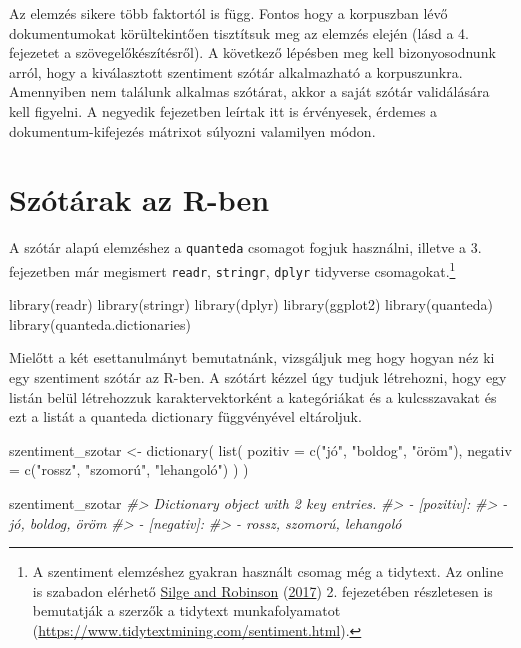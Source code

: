 \documentclass[
]{book}
\newenvironment{Shaded}{\begin{snugshade}}{\end{snugshade}}
\newcommand{\AttributeTok}[1]{\textcolor[rgb]{0.77,0.63,0.00}{#1}}
\newcommand{\CommentTok}[1]{\textcolor[rgb]{0.56,0.35,0.01}{\textit{#1}}}
\newcommand{\FunctionTok}[1]{\textcolor[rgb]{0.00,0.00,0.00}{#1}}
\newcommand{\NormalTok}[1]{#1}
\newcommand{\OtherTok}[1]{\textcolor[rgb]{0.56,0.35,0.01}{#1}}
\newcommand{\StringTok}[1]{\textcolor[rgb]{0.31,0.60,0.02}{#1}}
\begin{document}
Az elemzés sikere több faktortól is függ. Fontos hogy a korpuszban lévő
dokumentumokat körültekintően tisztítsuk meg az elemzés elején (lásd a
4. fejezetet a szövegelőkészítésről). A következő lépésben meg kell
bizonyosodnunk arról, hogy a kiválasztott szentiment szótár alkalmazható
a korpuszunkra. Amennyiben nem találunk alkalmas szótárat, akkor a saját
szótár validálására kell figyelni. A negyedik fejezetben leírtak itt is
érvényesek, érdemes a dokumentum-kifejezés mátrixot súlyozni valamilyen
módon.

\hypertarget{szuxf3tuxe1rak-az-r-ben}{%
\section{Szótárak az R-ben}\label{szuxf3tuxe1rak-az-r-ben}}

A szótár alapú elemzéshez a \texttt{quanteda} csomagot fogjuk használni,
illetve a 3. fejezetben már megismert \texttt{readr}, \texttt{stringr},
\texttt{dplyr} tidyverse csomagokat.\footnote{A szentiment elemzéshez
  gyakran használt csomag még a tidytext. Az online is szabadon elérhető
  \protect\hyperlink{ref-silge2017text}{Silge and Robinson}
  (\protect\hyperlink{ref-silge2017text}{2017}) 2. fejezetében
  részletesen is bemutatják a szerzők a tidytext munkafolyamatot
  (\url{https://www.tidytextmining.com/sentiment.html}).}

\begin{Shaded}
\begin{Highlighting}[]
\FunctionTok{library}\NormalTok{(readr)}
\FunctionTok{library}\NormalTok{(stringr)}
\FunctionTok{library}\NormalTok{(dplyr)}
\FunctionTok{library}\NormalTok{(ggplot2)}
\FunctionTok{library}\NormalTok{(quanteda)}
\FunctionTok{library}\NormalTok{(quanteda.dictionaries)}
\end{Highlighting}
\end{Shaded}

Mielőtt a két esettanulmányt bemutatnánk, vizsgáljuk meg hogy hogyan néz
ki egy szentiment szótár az R-ben. A szótárt kézzel úgy tudjuk
létrehozni, hogy egy listán belül létrehozzuk karaktervektorként a
kategóriákat és a kulcsszavakat és ezt a listát a quanteda dictionary
függvényével eltároljuk.

\begin{Shaded}
\begin{Highlighting}[]
\NormalTok{szentiment\_szotar }\OtherTok{\textless{}{-}} \FunctionTok{dictionary}\NormalTok{(}
  \FunctionTok{list}\NormalTok{(}
    \AttributeTok{pozitiv =} \FunctionTok{c}\NormalTok{(}\StringTok{"jó"}\NormalTok{, }\StringTok{"boldog"}\NormalTok{, }\StringTok{"öröm"}\NormalTok{),}
    \AttributeTok{negativ =} \FunctionTok{c}\NormalTok{(}\StringTok{"rossz"}\NormalTok{, }\StringTok{"szomorú"}\NormalTok{, }\StringTok{"lehangoló"}\NormalTok{)}
\NormalTok{    )}
\NormalTok{  )}

\NormalTok{szentiment\_szotar}
\CommentTok{\#\textgreater{} Dictionary object with 2 key entries.}
\CommentTok{\#\textgreater{} {-} [pozitiv]:}
\CommentTok{\#\textgreater{}   {-} jó, boldog, öröm}
\CommentTok{\#\textgreater{} {-} [negativ]:}
\CommentTok{\#\textgreater{}   {-} rossz, szomorú, lehangoló}
\end{Highlighting}
\end{Shaded}
\end{document}
